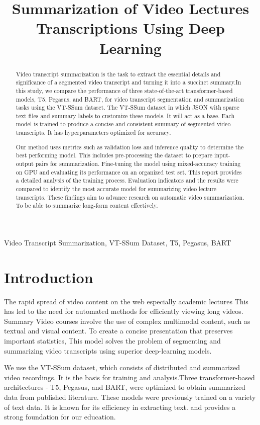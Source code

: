 \documentclass[conference]{IEEEtran}
\title{Summarization of Video Lectures Transcriptions Using Deep Learning}
\author{
    \IEEEauthorblockN{Harshil Pradhan - 243IT002}
    \IEEEauthorblockA{Information Technology\\
    National Institute of Technology Karnataka\\
    Surathkal, India 575025\\
    Email: harshil.243it002@nitk.edu.in}
    
}
\begin{document}
\maketitle

\begin{abstract}
    Video transcript summarization is the task  to extract the essential details and significance of a segmented video transcript and turning it into a succinct summary.In this study, we compare the performance of three state-of-the-art transformer-based models, T5, Pegasus, and BART, for video transcript segmentation and summarization tasks using the VT-SSum dataset. The VT-SSum dataset in which JSON with sparse text files and summary labels to customize these models. It will act as a base. Each model is trained to produce a concise and consistent summary of segmented video transcripts. It has hyperparameters optimized for accuracy.

    Our method uses metrics such as validation loss and inference quality to determine the best performing model. This includes pre-processing the dataset to prepare input-output pairs for summarization. Fine-tuning the model using mixed-accuracy training on GPU and evaluating its performance on an organized test set. This report provides a detailed analysis of the training process. Evaluation indicators and the results were compared to identify the most accurate model for summarizing video lecture transcripts. These findings aim to advance research on automatic video summarization. To be able to summarize long-form content effectively.
\end{abstract}

\begin{IEEEkeywords}
Video Transcript Summarization, VT-SSum Dataset, T5, Pegasus, BART
\end{IEEEkeywords}

\section{Introduction}
The rapid spread of video content on the web especially academic lectures This has led to the need for automated methods for efficiently viewing long videos. Summary Video courses involve the use of complex multimodal content, such as textual and visual content. To create a concise presentation that preserves important statistics, This model solves the problem of segmenting and summarizing video transcripts using superior deep-learning models.

We use the VT-SSum dataset, which consists of distributed and summarized video recordings. It is the basis for training and analysis.Three transformer-based architectures - T5, Pegasus, and BART, were optimized to obtain summarized data from published literature. These models were previously trained on a variety of text data. It is known for its efficiency in extracting text. and provides a strong foundation for our education.
\end{document}
